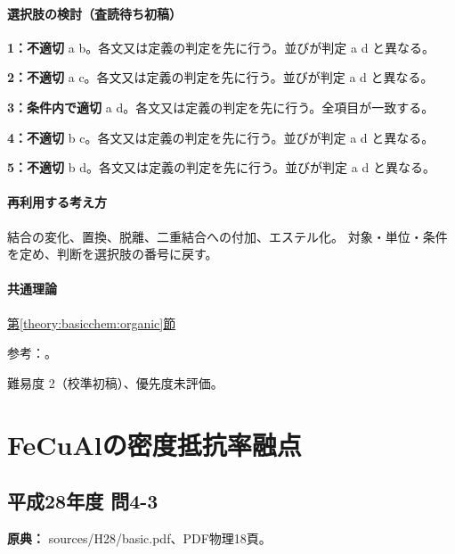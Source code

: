 \paragraph{選択肢の検討（査読待ち初稿）}\mbox{}\par

\noindent\textbf{1：不適切} a b。各文又は定義の判定を先に行う。並びが判定 a d と異なる。\par

\noindent\textbf{2：不適切} a c。各文又は定義の判定を先に行う。並びが判定 a d と異なる。\par

\noindent\textbf{3：条件内で適切} a d。各文又は定義の判定を先に行う。全項目が一致する。\par

\noindent\textbf{4：不適切} b c。各文又は定義の判定を先に行う。並びが判定 a d と異なる。\par

\noindent\textbf{5：不適切} b d。各文又は定義の判定を先に行う。並びが判定 a d と異なる。\par

\paragraph{再利用する考え方} 結合の変化、置換、脱離、二重結合への付加、エステル化。 対象・単位・条件を定め、判断を選択肢の番号に戻す。

\paragraph{共通理論} \hyperref[theory:basicchem:organic]{第\ref*{theory:basicchem:organic}節}

\par 参考：\cite{chem55_organic}。

\par 難易度 2（校準初稿）、優先度未評価。

\section{FeCuAlの密度抵抗率融点}

\subsection{平成28年度 問4-3}
\label{q:h28-reg-basic-4-3}

\noindent\textbf{原典：} sources/H28/basic.pdf、PDF物理18頁。

